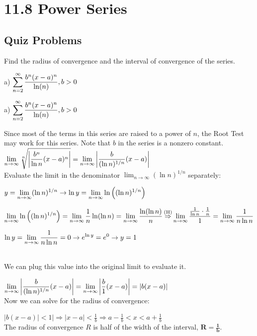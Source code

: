 \documentclass[12pt]{article}
\newcommand{\inftylim}[1]{\mathlarger{\lim_{n \to \infty}#1}}
\newcommand{\Heq}{\overset{\hidewidth(\mathrm{H})\hidewidth}{\Rightarrow}}
\begin{document}
\pagebreak

\section*{11.8 Power Series}

\subsection*{Quiz Problems}
Find the radius of convergence and the interval of convergence of the series.

a) $\mathlarger{\sum_{n=2}^{\infty} \frac{b^{n}(x-a)^{n}}{\ln(n)}},  b > 0$

\begin{solution}
a) $\mathlarger{\sum_{n=2}^{\infty} \frac{b^{n}(x-a)^{n}}{\ln(n)}}, b > 0$

Since most of the terms in this series are raised to a power of $n$, the Root Test may work for this series. Note that $b$ in the series is a nonzero constant. ~\\

$ \inftylim{\sqrt[n]{\left| \frac{b^{n}}{\ln n}(x - a)^{n} \right| }  } = \inftylim{ \left| \frac{b}{(\ln n)^{1/n}}(x - a) \right|}$ ~\\

Evaluate the limit in the denominator $\lim_{n \to \infty} (\ln n)^{1/n} $ separately:~\\

\begin{addmargin}[1em]{2em}
$\mathlarger{y = \lim_{n \to \infty} (\ln n)^{1/n} \rightarrow \ln y = \lim_{n \to \infty}\ln\left((\ln n)^{1/n}\right)}$ 

$\mathlarger{\lim_{n \to \infty}\ln\left((\ln n)^{1/n}\right) = \lim_{n \to \infty}\frac{1}{n}\ln(\ln n) = \lim_{n \to \infty}\frac{\ln(\ln n)}{n} \Heq \lim_{n \to \infty}   \frac{\frac{1}{\ln n} \cdot \frac{1}{n}}{1} = \lim_{n \to \infty}\frac{1}{n \ln n}}$


$\mathlarger{\ln y = \lim_{n \to \infty}\frac{1}{n \ln n} = 0 \rightarrow
e^{\ln y} = e^{0} \rightarrow 
y = 1}$ 
\end{addmargin} ~\\
We can plug this value into the original limit to evaluate it.


$ \inftylim{ \left| \frac{b}{(\ln n)^{1/n}}(x - a) \right|} = \inftylim{ \left| \frac{b}{1}(x - a) \right|} = \left|b(x - a) \right|$ ~\\

Now we can solve for the radius of convergence:

$ \left|b(x - a)| < 1\right| \Rightarrow \left| x - a \right| < \frac{1}{b} \Rightarrow a - \frac{1}{b} < x < a + \frac{1}{b}$ ~\\

The radius of convergence $R$ is half of the width of the interval, $\mathbf{R = \frac{1}{b}}$.~\\

\end{solution}
\end{document}
